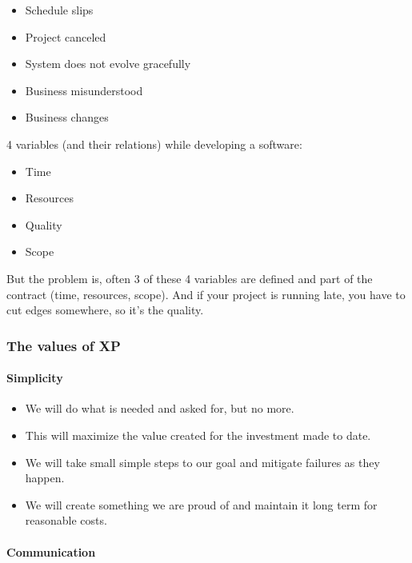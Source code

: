 \begin{itemize}
\tightlist
\item
  Schedule slips
\item
  Project canceled
\item
  System does not evolve gracefully
\item
  Business misunderstood
\item
  Business changes
\end{itemize}

4 variables (and their relations) while developing a software:

\begin{itemize}
\tightlist
\item
  Time
\item
  Resources
\item
  Quality
\item
  Scope
\end{itemize}

But the problem is, often 3 of these 4 variables are defined and part of
the contract (time, resources, scope). And if your project is running
late, you have to cut edges somewhere, so it's the quality.

\hypertarget{the-values-of-xp}{%
\subsubsection{The values of XP}\label{the-values-of-xp}}

\hypertarget{simplicity}{%
\paragraph{Simplicity}\label{simplicity}}

\begin{itemize}
\tightlist
\item
  We will do what is needed and asked for, but no more.
\item
  This will maximize the value created for the investment made to date.
\item
  We will take small simple steps to our goal and mitigate failures as
  they happen.
\item
  We will create something we are proud of and maintain it long term for
  reasonable costs.
\end{itemize}

\hypertarget{communication}{%
\paragraph{Communication}\label{communication}}

